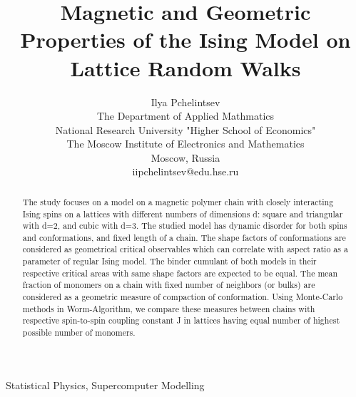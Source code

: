 \documentclass[conference]{IEEEtran}
\title{Magnetic and Geometric Properties of the Ising Model on Lattice Random Walks}
\author{Ilya Pchelintsev\\
The Department of Applied Mathmatics\\
National Research University "Higher School of Economics"\\
The Moscow Institute of Electronics and Mathematics\\
Moscow, Russia\\
iipchelintsev@edu.hse.ru}
\begin{document}
\maketitle



\begin{abstract}
The study focuses on a model on a magnetic polymer chain with closely interacting Ising spins on a lattices with different numbers of dimensions d: square and triangular with d=2, and cubic with d=3. The studied model has dynamic disorder for both spins and conformations, and fixed length of a chain. The shape factors of conformations are considered as geometrical critical observables which can correlate with aspect ratio as a parameter of regular Ising model. The binder cumulant of both models in their respective critical areas with same shape factors are expected to be equal. The mean fraction of monomers on a chain with fixed number of neighbors (or bulks) are considered as a geometric measure of compaction of conformation. Using Monte-Carlo methods in Worm-Algorithm, we compare these measures between chains with respective spin-to-spin coupling constant J in lattices having equal number of highest possible number of monomers. 
\end{abstract}

\begin{IEEEkeywords}
Statistical Physics, Supercomputer Modelling
\end{IEEEkeywords}












\end{document}
